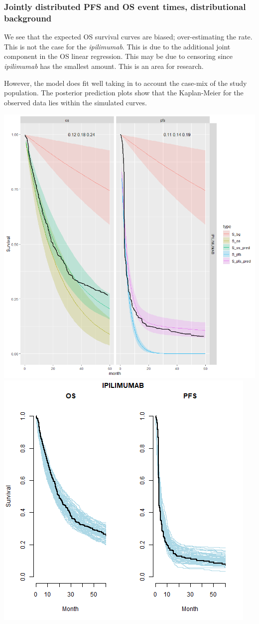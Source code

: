 \documentclass[
]{article}
\begin{document}
\hypertarget{jointly-distributed-pfs-and-os-event-times-distributional-background}{%
\subsubsection{Jointly distributed PFS and OS event times,
distributional
background}\label{jointly-distributed-pfs-and-os-event-times-distributional-background}}

We see that the expected OS survival curves are biased; over-estimating
the rate. This is not the case for the \emph{ipilimumab}. This is due to
the additional joint component in the OS linear regression. This may be
due to censoring since \emph{ipilimumab} has the smallest amount. This
is an area for research.

However, the model does fit well taking in to account the case-mix of
the study population. The posterior prediction plots show that the
Kaplan-Meier for the observed data lies within the simulated curves.

\begin{center}\includegraphics[width=0.4\linewidth]{../plots/S_plots_exp_exp_cf_separate_IPI_joint} \includegraphics[width=0.4\linewidth]{../plots/post_pred_joint_cf separate_exp_exp_IPILIMUMAB} \end{center}
\end{document}
